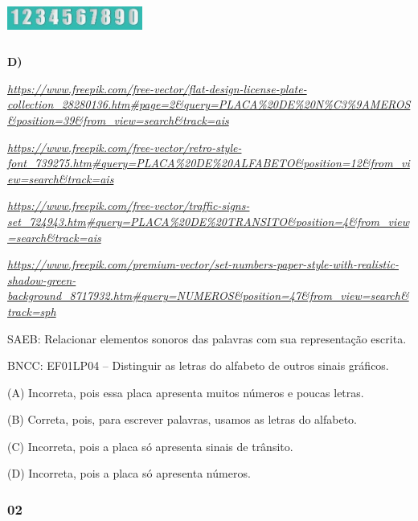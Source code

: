 \includegraphics[width=1.75000in,height=0.54792in]{media/image225.jpg}

\textbf{D)}

\href{https://www.freepik.com/free-vector/flat-design-license-plate-collection_28280136.htm\#page=2\&query=PLACA\%20DE\%20N\%C3\%9AMEROS\&position=39\&from_view=search\&track=ais}{\emph{https://www.freepik.com/free-vector/flat-design-license-plate-collection\_28280136.htm\#page=2\&query=PLACA\%20DE\%20N\%C3\%9AMEROS\&position=39\&from\_view=search\&track=ais}}

\href{https://www.freepik.com/free-vector/retro-style-font_739275.htm\#query=PLACA\%20DE\%20ALFABETO\&position=12\&from_view=search\&track=ais}{\emph{https://www.freepik.com/free-vector/retro-style-font\_739275.htm\#query=PLACA\%20DE\%20ALFABETO\&position=12\&from\_view=search\&track=ais}}

\href{https://www.freepik.com/free-vector/traffic-signs-set_724943.htm\#query=PLACA\%20DE\%20TRANSITO\&position=4\&from_view=search\&track=ais}{\emph{https://www.freepik.com/free-vector/traffic-signs-set\_724943.htm\#query=PLACA\%20DE\%20TRANSITO\&position=4\&from\_view=search\&track=ais}}

\href{https://www.freepik.com/premium-vector/set-numbers-paper-style-with-realistic-shadow-green-background_8717932.htm\#query=NUMEROS\&position=47\&from_view=search\&track=sph}{\emph{https://www.freepik.com/premium-vector/set-numbers-paper-style-with-realistic-shadow-green-background\_8717932.htm\#query=NUMEROS\&position=47\&from\_view=search\&track=sph}}

SAEB: Relacionar elementos sonoros das palavras com sua
representação escrita.

BNCC: EF01LP04 -- Distinguir as letras do alfabeto de outros sinais
gráficos.

(A) Incorreta, pois essa placa apresenta muitos números e poucas letras.

(B) Correta, pois, para escrever palavras, usamos as letras do alfabeto.

(C) Incorreta, pois a placa só apresenta sinais de trânsito.

(D) Incorreta, pois a placa só apresenta
números.\protect\hypertarget{_heading=h.vsxh2fkjtnnn}{}{}

\subsubsection{02}\label{section-58}

